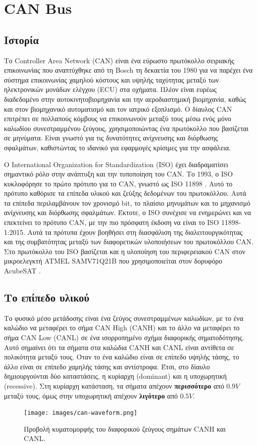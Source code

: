 \documentclass[a4paper,nobib,justified]{tufte-book}
\begin{document}
\section{CAN Bus}
\label{canbus}
\subsection{Ιστορία}
Το Controller Area Network (CAN) είναι ένα εύρωστο πρωτόκολλο σειριακής επικοινωνίας που αναπτύχθηκε από τη Bosch τη δεκαετία του 1980 για να παρέχει ένα σύστημα επικοινωνίας χαμηλού κόστους και υψηλής ταχύτητας μεταξύ των ηλεκτρονικών μονάδων ελέγχου (ECU) στα οχήματα. Πλέον είναι ευρέως διαδεδομένο στην αυτοκινητοβιομηχανία και την αεροδιαστημική βιομηχανία, καθώς και στον βιομηχανικό αυτοματισμό και τον ιατρικό εξοπλισμό. Ο δίαυλος CAN επιτρέπει σε πολλαπούς κόμβους να επικοινωνούν μεταξύ τους μέσω ενός μόνο καλωδίου συνεστραμμένου ζεύγους, χρησιμοποιώντας ένα πρωτόκολλο που βασίζεται σε μηνύματα. Είναι γνωστό για τις δυνατότητες ανίχνευσης και διόρθωσης σφαλμάτων, καθιστώντας το ιδανικό για εφαρμογές κρίσιμες για την ασφάλεια.

Ο International Organization for Standardization (ISO) έχει διαδραματίσει σημαντικό ρόλο στην ανάπτυξη και την τυποποίηση του CAN. Το 1993, ο ISO κυκλοφόρησε το πρώτο πρότυπο για το CAN, γνωστό ως ISO 11898 . Αυτό το πρότυπο καθόρισε τα επίπεδα υλικού και ζεύξης δεδομένων του πρωτοκόλλου. Αυτά τα επίπεδα περιλαμβάνουν τον χρονισμό bit, το πλαίσιο μηνυμάτων και το μηχανισμό ανίχνευσης και διόρθωσης σφαλμάτων. Έκτοτε, ο ISO συνέχισε να ενημερώνει και να επεκτείνει το πρότυπο CAN, με την πιο πρόσφατη έκδοση να είναι το ISO 11898-1:2015. Αυτά τα πρότυπα έχουν βοηθήσει στη διασφάλιση της διαλειτουργικότητας και της συμβατότητας μεταξύ των διαφορετικών υλοποιήσεων του πρωτοκόλλου CAN. Στο πρωτόκολλο του ISO βασίζεται και η υλοποίηση του περιφερειακού CAN στον μικροελεγκτή ATMEL SAMV71Q21B που χρησιμοποιείται στον δορυφόρο AcubeSAT .

\subsection{Το επίπεδο υλικού}
Το φυσικό μέσο μετάδοσης είναι ένα ζεύγος συνεστραμμένων καλωδίων, με το ένα καλώδιο να μεταφέρει το σήμα CAN High (CANH) και το άλλο να μεταφέρει το σήμα CAN Low (CANL) σε ένα ισορροπημένο σχήμα διαφορικής σηματοδότησης. Αυτό σημαίνει ότι τα σήματα στα καλώδια CANH και CANL είναι αντίθετα σε πολικότητα μεταξύ τους. Όταν το ένα καλώδιο είναι σε επίπεδο υψηλής τάσης, το άλλο είναι σε επίπεδο χαμηλής τάσης και αντίστροφα. Έτσι, στο δίαυλο δημιουργούνται δύο καταστάσεις, η κυρίαρχη (dominant) και η υποχωρητική (recessive). Στη κυρίαρχη κατάσταση, τα σήματα απέχουν \textbf{περισσότερο} από $0.9V$ μεταξύ τους, όμως στην υποχωρητική απέχουν \textbf{λιγότερο} από $0.5V$.
\begin{figure}
	\texttt{[image: images/can-waveform.png]}
	\label{fig:can-waveform}
	\caption[Προβολή κυματομορφών CAN]{Προβολή κυματομορφής του διαφορικού ζεύγους σημάτων CANH και CANL. \cite{digikey2021canbus}}
\end{figure}
\end{document}
